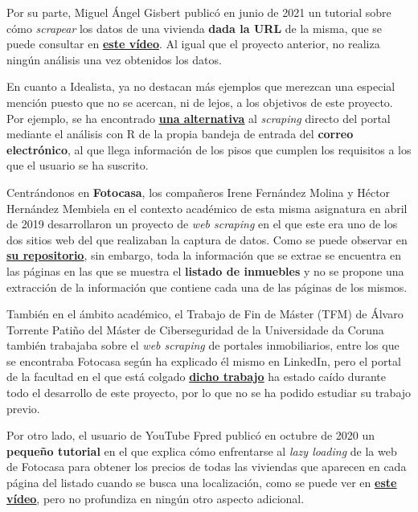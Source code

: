 \documentclass[12pt]{article}
\begin{document}
Por su parte, Miguel Ángel Gisbert publicó en junio de 2021 un tutorial sobre cómo \textit{scrapear} los datos de una vivienda \textbf{dada la URL} de la misma, que se puede consultar en \href{https://www.youtube.com/watch?v=2UyJv5oe570}{\textbf{\underline{este vídeo}}}. Al igual que el proyecto anterior, no realiza ningún análisis una vez obtenidos los datos. 

En cuanto a Idealista, ya no destacan más ejemplos que merezcan una especial mención puesto que no se acercan, ni de lejos, a los objetivos de este proyecto. Por ejemplo, se ha encontrado \href{https://medium.com/@rubenmarcos/crear-una-base-de-datos-de-la-evoluci%C3%B3n-del-mercado-inmobiliario-con-idealista-y-r-y-sin-scraping-1d5025a9d47e}{\textbf{\underline{una alternativa}}} al \textit{scraping} directo del portal mediante el análisis con R de la propia bandeja de entrada del\textbf{ correo electrónico}, al que llega información de los pisos que cumplen los requisitos a los que el usuario se ha suscrito.

Centrándonos en \textbf{Fotocasa}, los compañeros Irene Fernández Molina y Héctor Hernández Membiela en el contexto académico de esta misma asignatura en abril de 2019 desarrollaron un proyecto de \textit{web scraping} en el que este era uno de los dos sitios web del que realizaban la captura de datos. Como se puede observar en \href{https://github.com/EdelBlau/PEC_TPC}{\textbf{\underline{su repositorio}}}, sin embargo, toda la información que se extrae se encuentra en las páginas en las que se muestra el\textbf{ listado de inmuebles }y no se propone una extracción de la información que contiene cada una de las páginas de los mismos. 

También en el ámbito académico, el Trabajo de Fin de Máster (TFM) de Álvaro Torrente Patiño del Máster de Ciberseguridad de la Universidade da Coruna también trabajaba sobre el \textit{web scraping} de portales inmobiliarios, entre los que se encontraba Fotocasa según ha explicado él mismo en LinkedIn, pero el portal de la facultad en el que está colgado \href{http://castor.det.uvigo.es:8080/xmlui/bitstream/handle/123456789/575/TorrentePatino_Alvaro_TFM_2021.pdf?sequence=1&isAllowed=y}{\textbf{\underline{dicho trabajo}}} ha estado caído durante todo el desarrollo de este proyecto, por lo que no se ha podido estudiar su trabajo previo.  

Por otro lado, el usuario de YouTube Fpred publicó en octubre de 2020 un \textbf{pequeño tutorial} en el que explica cómo enfrentarse al \textit{lazy loading} de la web de Fotocasa para obtener los precios de todas las viviendas que aparecen en cada página del listado cuando se busca una localización, como se puede ver en \href{https://www.youtube.com/watch?v=WMjV7rF3oX8}{\textbf{\underline{este vídeo}}}, pero no profundiza en ningún otro aspecto adicional. 
\end{document}
